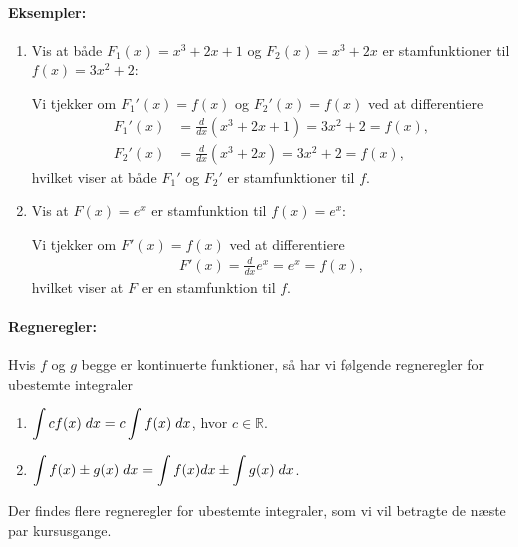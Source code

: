 \paragraph*{Eksempler:}
\begin{enumerate}
\item Vis at både $F_1(x)=x^3+2x+1$ og $F_2(x)=x^3+2x$ er stamfunktioner til $f(x)=3x^2+2$:

Vi tjekker om $F_1'(x)=f(x)$ og $F_2'(x)=f(x)$ ved at differentiere
\begin{align*}
F_1'(x)&=\frac{d}{dx}(x^3+2x+1)=3x^2+2 = f(x),\\
F_2'(x)&=\frac{d}{dx}(x^3+2x)=3x^2+2 = f(x),
\end{align*}
hvilket viser at både $F_1'$ og $F_2'$ er stamfunktioner til $f$.
\item Vis at $F(x)=e^x$ er stamfunktion til $f(x)=e^x$:

Vi tjekker om $F'(x)=f(x)$ ved at differentiere
\begin{align*}
F'(x)=\frac{d}{dx}e^x = e^x = f(x),
\end{align*}
hvilket viser at $F$ er en stamfunktion til $f$.
\end{enumerate}
\paragraph*{Regneregler:}
Hvis $f$ og $g$ begge er kontinuerte funktioner, så har vi følgende regneregler for ubestemte integraler
\begin{enumerate}
\item $\displaystyle \int c f(x) \; d x = c \int f(x) \; d x$, hvor $c \in \mathbb{R}$.
\item $\displaystyle \int f(x) \pm g(x) \; d x = \int f(x) dx \pm \int g(x) \; d x$.
\end{enumerate}
Der findes flere regneregler for ubestemte integraler, som vi vil betragte de næste par kursusgange.

